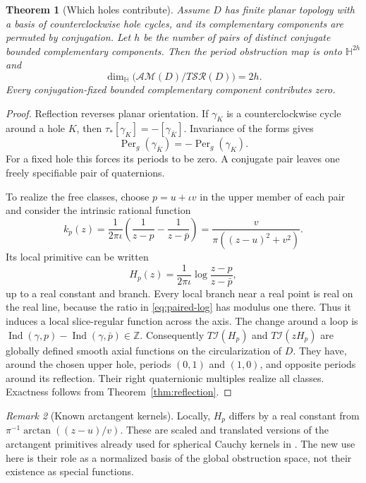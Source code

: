 \documentclass[11pt,a4paper]{article}
\numberwithin{equation}{section}
\newtheorem{theorem}{Theorem}[section]
\theoremstyle{definition}
\theoremstyle{remark}
\newtheorem{remark}[theorem]{Remark}
\newcommand{\HH}{\mathbb H}
\newcommand{\ic}{\iota}
\newcommand{\SR}{\mathcal{SR}}
\newcommand{\AM}{\mathcal{AM}}
\newcommand{\Per}{\operatorname{Per}}
\newcommand{\Ind}{\operatorname{Ind}}
\newcommand{\cI}{\mathcal I}
\begin{document}
\begin{theorem}[Which holes contribute]\label{thm:real-holes}
Assume $D$ has finite planar topology with a basis of counterclockwise hole
cycles, and its complementary components are permuted by conjugation. Let
$h$ be the number of pairs of distinct conjugate bounded complementary
components. Then the period obstruction map is onto $\HH^{2h}$ and
\begin{equation}
 \dim_{\HH}\bigl(\AM(D)/T\SR(D)\bigr)=2h.
 \label{eq:real-dimension}
\end{equation}
Every conjugation-fixed bounded complementary component contributes zero.
\end{theorem}
\begin{proof}
Reflection reverses planar orientation. If $\gamma_K$ is a counterclockwise
cycle around a hole $K$, then
$\tau_*[\gamma_K]=-[\gamma_{\bar K}]$. Invariance of the forms gives
\[
 \Per_g(\gamma_{\bar K})=-\Per_g(\gamma_K).
\]
For a fixed hole this forces its periods to be zero. A conjugate pair leaves
one freely specifiable pair of quaternions.

To realize the free classes, choose $p=u+\ic v$ in the upper member of each
pair and consider the intrinsic rational function
\begin{equation}
 k_p(z)=\frac{1}{2\pi\ic}
 \left(\frac1{z-p}-\frac1{z-\bar p}\right)
 =\frac{v}{\pi((z-u)^2+v^2)}.
 \label{eq:paired-derivative}
\end{equation}
Its local primitive can be written
\begin{equation}
 H_p(z)=\frac{1}{2\pi\ic}
 \log\frac{z-p}{z-\bar p},
 \label{eq:paired-log}
\end{equation}
up to a real constant and branch. Every local branch near a real point is
real on the real line, because the ratio in \eqref{eq:paired-log} has modulus
one there. Thus it induces a local slice-regular function across the axis.
The change around a loop is
$\Ind(\gamma,p)-\Ind(\gamma,\bar p)\in\mathbb Z$.
Consequently $T\cI(H_p)$ and $T\cI(zH_p)$ are globally defined smooth axial
functions on the circularization of $D$. They have, around the chosen upper
hole, periods $(0,1)$ and $(1,0)$, and opposite periods around its reflection.
Their right quaternionic multiples realize all classes. Exactness follows
from Theorem~\ref{thm:reflection}.
\end{proof}

\begin{remark}[Known arctangent kernels]
Locally, $H_p$ differs by a real constant from
$\pi^{-1}\arctan((z-u)/v)$. These are scaled and translated versions of the
arctangent primitives already used for spherical Cauchy kernels in
\cite{CSS,CPSS}. The new use here is their role as a normalized basis of the
global obstruction space, not their existence as special functions.
\end{remark}
\end{document}
